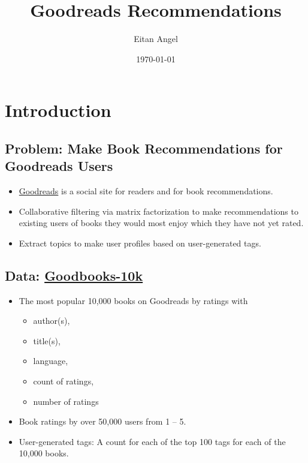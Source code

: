 \documentclass[handout]{beamer}
\title{Goodreads Recommendations}
\author{Eitan Angel}
\date{\today}
\begin{document}
    	

%



\frame{\tableofcontents[hideallsubsections]}

\usebackgroundtemplate{%
}
\section{Introduction}
\subsection{Problem: Make Book Recommendations for Goodreads Users}\label{problem}

\begin{frame}

\begin{itemize}[<+->]
\item \href{https://www.goodreads.com}{Goodreads} is a social site 
for readers and for book recommendations.
\vfill
\item Collaborative filtering via matrix factorization to make recommendations 
to existing users of books they would most enjoy which they have not yet rated.
\vfill
\item Extract topics to make user profiles based on user-generated tags.
\end{itemize}

\end{frame}



\subsection{Data: \href{https://github.com/zygmuntz/goodbooks-10k}{Goodbooks-10k}}\label{data}

\begin{frame}

\begin{itemize}[<+->]
\item The most popular 10,000 books on Goodreads by ratings with
\begin{itemize}[<+->]
\item author(s),
\item title(s),
\item language,
\item count of ratings, 
\item number of ratings
\end{itemize}
\vfill
\item Book ratings by over 50,000 users from 1 -- 5.
\vfill
\item User-generated tags: A count for each of the top 100 tags for each of the 10,000 books.
\end{itemize}

\end{frame}
\end{document}
